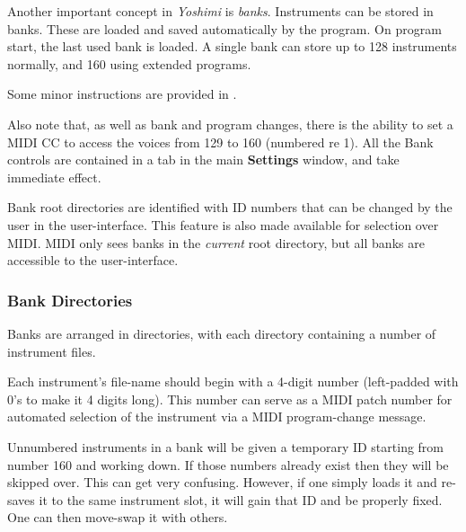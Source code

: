    Another important concept in \textsl{Yoshimi} is \textsl{banks}.  Instruments
   can be stored in banks. These are loaded and saved automatically by the
   program.  On program start, the last used bank is loaded. A single bank
   can store up to 128 instruments normally, and 160 using extended programs.


   Some minor instructions are provided in
   .

   Also note that, as well as bank and program changes, there is the ability
   to set a MIDI CC to access the voices from 129 to 160 (numbered re 1).
   All the Bank
   controls are contained in a tab in the main \textbf{Settings}
   window, and take immediate effect.

   Bank root directories are identified with ID numbers that can be changed
   by the user in the user-interface. This feature is also made available for
   selection over MIDI.  MIDI only sees banks in the \textsl{current} root
   directory, but all banks are accessible to the user-interface.

\subsubsection{Bank Directories}
\label{subsubsec:banks_and_roots_bank_directories}

   Banks are arranged in directories, with each directory containing a number
   of instrument files.

   Each instrument's file-name should begin with a 4-digit number
   (left-padded with 0's to make it 4 digits long).  This number can serve
   as a MIDI patch number for automated selection of the instrument via a
   MIDI program-change message.

   Unnumbered instruments in a bank will be given a temporary ID starting
   from number 160 and working down. If those numbers already exist then
   they will be skipped over. This can get very confusing. However, if one
   simply loads it and re-saves it to the same instrument slot, it will gain
   that ID and be properly fixed.  One can then move-swap it with others.


